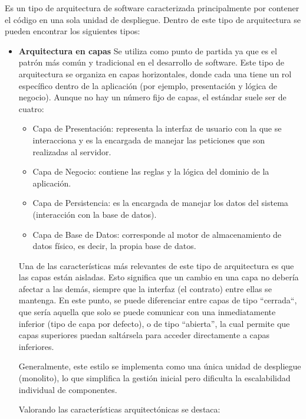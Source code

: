 Es un tipo de arquitectura de software caracterizada principalmente por contener el código en una sola unidad de despliegue.
Dentro de este tipo de arquitectura se pueden encontrar los siguientes tipos:

\begin{itemize}
    \item \textbf{Arquitectura en capas}
    \newline
    Se utiliza como punto de partida ya que es el patrón más común y tradicional en el desarrollo de software. Este
    tipo de arquitectura se organiza en capas horizontales, donde cada una tiene un rol específico dentro de la 
    aplicación (por ejemplo, presentación y lógica de negocio). Aunque no hay un número fijo de capas, el estándar
    suele ser de cuatro:

    \begin{itemize}
        \item Capa de Presentación: representa la interfaz de usuario con la que se interacciona y es la encargada de
        manejar las peticiones que son realizadas al servidor.
        \item Capa de Negocio: contiene las reglas y la lógica del dominio de la aplicación.
        \item Capa de Persistencia: es la encargada de manejar los datos del sistema (interacción con la base de datos).
        \item Capa de Base de Datos: corresponde al motor de almacenamiento de datos físico, es decir, la propia base de datos.
    \end{itemize}

    Una de las características más relevantes de este tipo de arquitectura es que las capas están aisladas. Esto 
    significa que un cambio en una capa no debería afectar a las demás, siempre que la interfaz (el contrato) entre 
    ellas se mantenga. En este punto, se puede diferenciar entre capas de tipo ``cerrada``, que sería aquella que solo
    se puede comunicar con una inmediatamente inferior (tipo de capa por defecto), o de tipo ``abierta'', la cual permite
    que capas superiores puedan saltársela para acceder directamente a capas inferiores.

    Generalmente, este estilo se implementa como una única unidad de despliegue (monolito), lo que simplifica la gestión 
    inicial pero dificulta la escalabilidad individual de componentes.

    Valorando las características arquitectónicas se destaca:


\end{itemize}
